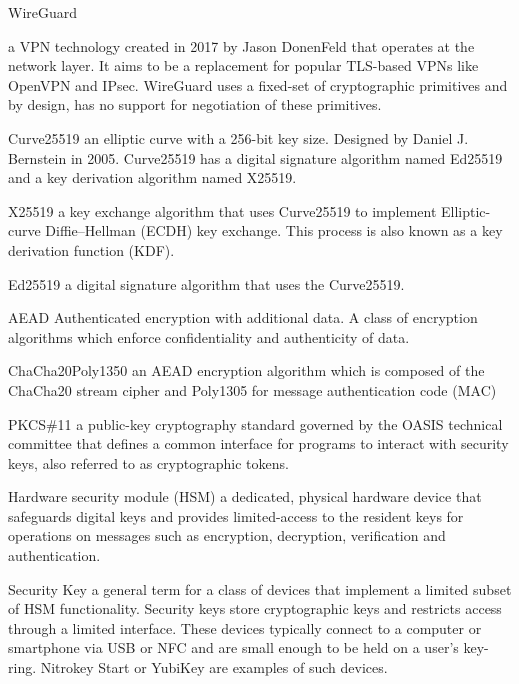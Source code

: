 \documentclass [11pt, proquest] {uwthesis}[2020/02/24]
\begin{document}
\begin{glossary}

\item[WireGuard]

a VPN technology created in 2017 by Jason DonenFeld that operates at the network layer. It aims to be a replacement for popular TLS-based VPNs like OpenVPN and IPsec. WireGuard uses a fixed-set of cryptographic primitives and by design, has no support for negotiation of these primitives. 

\item[Curve25519]
an elliptic curve with a 256-bit key size. Designed by Daniel J. Bernstein in 2005\cite{noauthor_curve25519_nodate}. 
Curve25519 has a digital signature algorithm named Ed25519 and a key derivation algorithm named X25519.

\item[X25519]
a key exchange algorithm that uses Curve25519 to implement Elliptic-curve Diffie–Hellman (ECDH) key exchange. This process is also known as a key derivation function (KDF).

\item[Ed25519] a digital signature algorithm that uses the Curve25519.

\item[AEAD]
Authenticated encryption with additional data. A class of encryption algorithms which enforce confidentiality and authenticity of data. 

\item[ChaCha20Poly1350]
an AEAD encryption algorithm which is composed of the ChaCha20 stream cipher and Poly1305 for message authentication code (MAC)

\item[PKCS\#11] a public-key cryptography standard governed by the OASIS technical committee\cite{noauthor_cryptsoft_nodate} that defines a common interface for programs to interact with security keys, also referred to as cryptographic tokens.

\item[Hardware security module]
(HSM) a dedicated, physical hardware device that safeguards digital keys and provides limited-access to the resident keys for operations on messages such as encryption, decryption, verification and authentication. 

\item[Security Key]
a general term for a class of devices that implement a limited subset of HSM functionality. Security keys store cryptographic keys and restricts access through a limited interface. These devices typically connect to a computer or smartphone via USB or NFC and are small enough to be held on a user's key-ring.
Nitrokey Start\cite{noauthor_nitrokey_nodate} or YubiKey\cite{noauthor_discover_nodate}\cite{noauthor_u2f_nodate-1} are examples of such devices.

\end{glossary}
\end{document}
